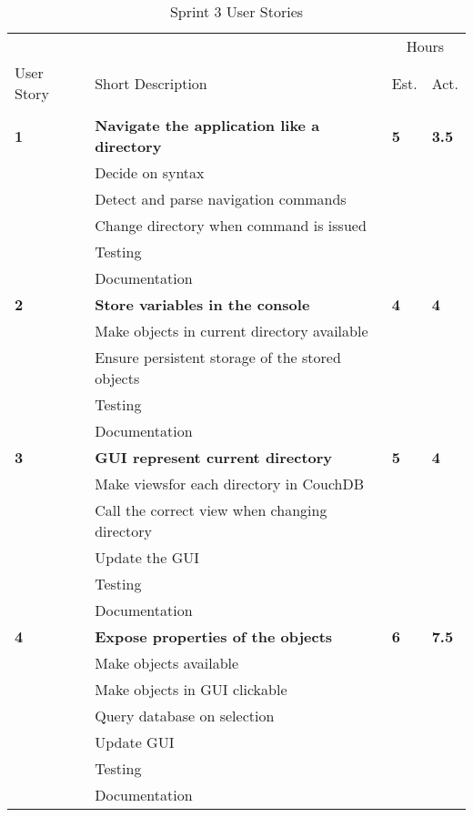 \begin{table}
\caption{Sprint 3 User Stories}
\centering
\begin{tabular}{ l p{8cm} l l }
\hline 
			&				&\multicolumn{2}{c}{Hours}			\\
 User Story	& Short Description		&Est.		&Act.	                               \\ 
\hline \\ [-2.0ex]
 
\bf{1}     &\bf{Navigate the application like a directory}		&\bf{5}		&\bf{3.5}          \\ 
		  &Decide on syntax						&			&		\\
		  &Detect and parse navigation commands	&			&		\\
		  &Change directory when command is issued&			&		\\
		  &Testing							&			&		\\
		  &Documentation						&			&		\\

 \bf{2}     &\bf{Store variables in the console} 				&\bf{4}		&\bf{4}               \\ 
		  &Make objects in current directory available		&			&		\\
		  &Ensure persistent storage of the stored objects	&			&		\\
		  &Testing								&			&		\\
		  &Documentation							&			&		\\

 \bf{3}     &\bf{GUI represent current directory} 			&\bf{5}		&\bf{4}		     \\ 
		  &Make viewsfor each directory in CouchDB		&			&		\\
		  &Call the correct view when changing directory	&			&		\\
		  &Update the GUI							&			&		\\
		  &Testing								&			&		\\
		  &Documentation							&			&		\\

 \bf{4}   	&\bf{Expose properties of the objects}			&\bf{6}		&\bf{7.5}		     \\ 
		  &Make objects available						&			&		\\
		  &Make objects in GUI clickable				&			&		\\
		  &Query database on selection				&			&		\\
		  &Update GUI								&			&		\\
		  &Testing								&			&		\\
		  &Documentation							&			&		\\


\end{tabular}
\end{table}
